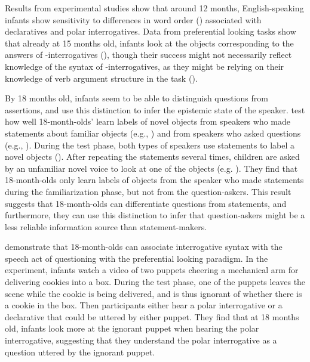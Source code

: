 Results from experimental studies show that around 12 months, English-speaking infants show sensitivity to differences in word order (\citealt{geffenmintz2015wordorder}) associated with declaratives and polar interrogatives. Data from preferential looking tasks show that already at 15 months old, infants look at the objects corresponding to the answers of \twh-interrogatives (\citealt{seidl2003wh, gagliardi2016wh, perkins2020filler}), though their success might not necessarily reflect knowledge of the syntax of \twh-interrogatives, as they might be relying on their knowledge of verb argument structure in the task (\citealt{perkins2019}). 

By 18 months old, infants seem to be able to distinguish questions from assertions, and use this distinction to infer the epistemic state of the speaker. \textcite{luchkina2018infant} test how well 18-month-olds’ learn labels of novel objects from speakers who made statements about familiar objects (e.g., ) and from speakers who asked questions (e.g., ). During the test phase, both types of speakers use statements to label a novel objects (). After repeating the statements several times, children are asked by an unfamiliar novel voice to look at one of the objects (e.g. ). They find that 18-month-olds only learn labels of objects from the speaker who made statements during the familiarization phase, but not from the question-askers. This result suggests that 18-month-olds can differentiate questions from statements, and furthermore, they can use this distinction to infer that question-askers might be a less reliable information source than statement-makers. 

\textcite{marshmallowqueen} demonstrate that 18-month-olds can associate interrogative syntax with the speech act of questioning with the preferential looking paradigm. In the experiment, infants watch a video of two puppets cheering a mechanical arm for delivering cookies into a box. During the test phase, one of the puppets leaves the scene while the cookie is being delivered, and is thus ignorant of whether there is a cookie in the box. Then participants either hear a polar interrogative  or a declarative  that could be uttered by either puppet. They find that at 18 months old, infants look more at the ignorant puppet when hearing the polar interrogative, suggesting that they understand the polar interrogative as a question uttered by the ignorant puppet.

